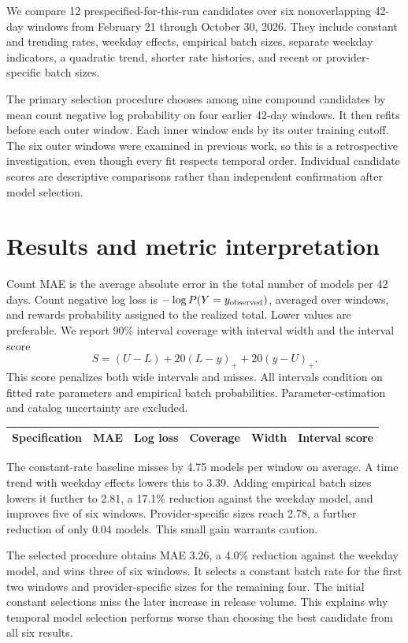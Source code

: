 \documentclass[10pt]{article}
\begin{document}
We compare 12 prespecified-for-this-run candidates over six nonoverlapping 42-day windows from February 21 through October 30, 2026. They include constant and trending rates, weekday effects, empirical batch sizes, separate weekday indicators, a quadratic trend, shorter rate histories, and recent or provider-specific batch sizes.

The primary selection procedure chooses among nine compound candidates by mean count negative log probability on four earlier 42-day windows. It then refits before each outer window. Each inner window ends by its outer training cutoff. The six outer windows were examined in previous work, so this is a retrospective investigation, even though every fit respects temporal order. Individual candidate scores are descriptive comparisons rather than independent confirmation after model selection.
\newpage
\section*{Results and metric interpretation}
Count MAE is the average absolute error in the total number of models per 42 days. Count negative log loss is $-\log P(Y=y_{\rm observed})$, averaged over windows, and rewards probability assigned to the realized total. Lower values are preferable. We report 90\% interval coverage with interval width and the interval score
\[
 S=(U-L)+20(L-y)_+ +20(y-U)_+.
\]
This score penalizes both wide intervals and misses. All intervals condition on fitted rate parameters and empirical batch probabilities. Parameter-estimation and catalog uncertainty are excluded.

{\small
\setlength{\tabcolsep}{9pt}
\begin{tabular}{@{}lrrrrr@{}}
\toprule
Specification & MAE & Log loss & Coverage & Width & Interval score\\
\midrule

\end{tabular}
}

The constant-rate baseline misses by 4.75 models per window on average. A time trend with weekday effects lowers this to 3.39. Adding empirical batch sizes lowers it further to 2.81, a 17.1\% reduction against the weekday model, and improves five of six windows. Provider-specific sizes reach 2.78, a further reduction of only 0.04 models. This small gain warrants caution.

The selected procedure obtains MAE 3.26, a 4.0\% reduction against the weekday model, and wins three of six windows. It selects a constant batch rate for the first two windows and provider-specific sizes for the remaining four. The initial constant selections miss the later increase in release volume. This explains why temporal model selection performs worse than choosing the best candidate from all six results.
\end{document}
